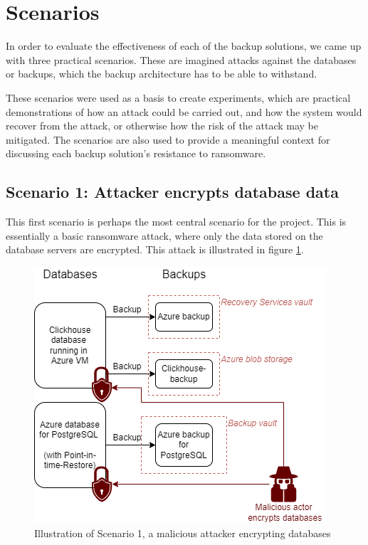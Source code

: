 \section{Scenarios} \label{Scenarios}
In order to evaluate the effectiveness of each of the backup solutions, we came up with three practical scenarios. These are imagined attacks against the databases or backups, which the backup architecture has to be able to withstand.

These scenarios were used as a basis to create experiments, which are practical demonstrations of how an attack could be carried out, and how the system would recover from the attack, or otherwise how the risk of the attack may be mitigated. The scenarios are also used to provide a meaningful context for discussing each backup solution's resistance to ransomware. 

\subsection{Scenario 1: Attacker encrypts database data}

This first scenario is perhaps the most central scenario for the project.
This is essentially a basic ransomware attack, where only the data stored on the database servers are encrypted.
This attack is illustrated in figure \ref{fig:scenario 1}.

\begin{figure}[h!]
    \centering
    \includegraphics[width=.9\linewidth]{figures/Scenario1.png}
    \caption{Illustration of Scenario 1, a malicious attacker encrypting databases}
    \label{fig:scenario 1}
\end{figure}


